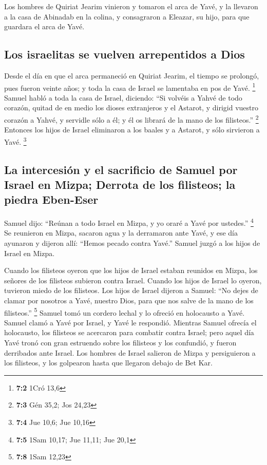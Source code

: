 \begin{paracol}{2}
 Los hombres de Quiriat Jearim vinieron y tomaron el arca
de Yavé, y la llevaron a la casa de Abinadab en la colina, y consagraron
a Eleazar, su hijo, para que guardara el arca de Yavé.

\hypertarget{los-israelitas-se-vuelven-arrepentidos-a-dios}{%
\subsection{Los israelitas se vuelven arrepentidos a
Dios}\label{los-israelitas-se-vuelven-arrepentidos-a-dios}}

 Desde el día en que el arca permaneció en Quiriat Jearim,
el tiempo se prolongó, pues fueron veinte años; y toda la casa de Israel
se lamentaba en pos de Yavé. \footnote{\textbf{7:2} 1Cró 13,6}
 Samuel habló a toda la casa de Israel, diciendo: ``Si
volvéis a Yahvé de todo corazón, quitad de en medio los dioses
extranjeros y el Astarot, y dirigid vuestro corazón a Yahvé, y servidle
sólo a él; y él os librará de la mano de los filisteos.'' \footnote{\textbf{7:3}
  Gén 35,2; Jos 24,23}  Entonces los hijos de Israel
eliminaron a los baales y a Astarot, y sólo sirvieron a Yavé.
\footnote{\textbf{7:4} Jue 10,6; Jue 10,16}

\hypertarget{la-intercesiuxf3n-y-el-sacrificio-de-samuel-por-israel-en-mizpa-derrota-de-los-filisteos-la-piedra-eben-eser}{%
\subsection{La intercesión y el sacrificio de Samuel por Israel en
Mizpa; Derrota de los filisteos; la piedra
Eben-Eser}\label{la-intercesiuxf3n-y-el-sacrificio-de-samuel-por-israel-en-mizpa-derrota-de-los-filisteos-la-piedra-eben-eser}}

 Samuel dijo: ``Reúnan a todo Israel en Mizpa, y yo oraré
a Yavé por ustedes.'' \footnote{\textbf{7:5} 1Sam 10,17; Jue 11,11; Jue
  20,1}  Se reunieron en Mizpa, sacaron agua y la
derramaron ante Yavé, y ese día ayunaron y dijeron allí: ``Hemos pecado
contra Yavé.'' Samuel juzgó a los hijos de Israel en Mizpa.

 Cuando los filisteos oyeron que los hijos de Israel
estaban reunidos en Mizpa, los señores de los filisteos subieron contra
Israel. Cuando los hijos de Israel lo oyeron, tuvieron miedo de los
filisteos.  Los hijos de Israel dijeron a Samuel: ``No
dejes de clamar por nosotros a Yavé, nuestro Dios, para que nos salve de
la mano de los filisteos.'' \footnote{\textbf{7:8} 1Sam 12,23}
 Samuel tomó un cordero lechal y lo ofreció en holocausto
a Yavé. Samuel clamó a Yavé por Israel, y Yavé le respondió.
 Mientras Samuel ofrecía el holocausto, los filisteos se
acercaron para combatir contra Israel; pero aquel día Yavé tronó con
gran estruendo sobre los filisteos y los confundió, y fueron derribados
ante Israel.  Los hombres de Israel salieron de Mizpa y
persiguieron a los filisteos, y los golpearon hasta que llegaron debajo
de Bet Kar.


\end{paracol}
